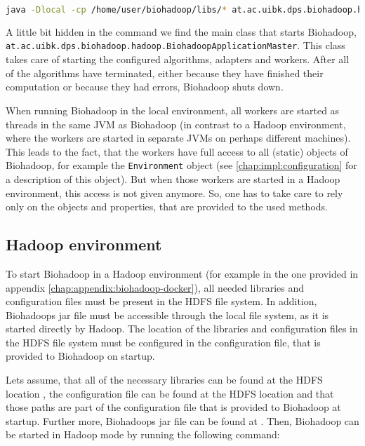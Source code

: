   \begin{lstlisting}[language=bash]
java -Dlocal -cp /home/user/biohadoop/libs/* at.ac.uibk.dps.biohadoop.hadoop.BiohadoopApplicationMaster /home/user/biohadoop/configs/simple-config-json
  \end{lstlisting}

  A little bit hidden in the command we find the main class that starts Biohadoop, \texttt{at.ac.uibk.dps.biohadoop.hadoop.BiohadoopApplicationMaster}. This class takes care of starting the configured algorithms, adapters and workers. After all of the algorithms have terminated, either because they have finished their computation or because they had errors, Biohadoop shuts down.
  
  When running Biohadoop in the local environment, all workers are started as threads in the same JVM as Biohadoop (in contrast to a Hadoop environment, where the workers are started in separate JVMs on perhaps different machines). This leads to the fact, that the workers have full access to all (static) objects of Biohadoop, for example the \texttt{Environment} object (see \ref{chap:impl:configuration} for a description of this object). But when those workers are started in a Hadoop environment, this access is not given anymore. So, one has to take care to rely only on the objects and properties, that are provided to the used methods.

  \subsection{Hadoop environment}
  \label{chap:usage:hadoop}
  To start Biohadoop in a Hadoop environment (for example in the one provided in appendix \ref{chap:appendix:biohadoop-docker}), all needed libraries and configuration files must be present in the HDFS file system. In addition, Biohadoops jar file must be accessible through the local file system, as it is started directly by Hadoop. The location of the libraries and configuration files in the HDFS file system must be configured in the configuration file, that is provided to Biohadoop on startup.
  
  Lets assume, that all of the necessary libraries can be found at the HDFS location , the configuration file can be found at the HDFS location  and that those paths are part of the configuration file that is provided to Biohadoop at startup. Further more, Biohadoops jar file can be found at . Then, Biohadoop can be started in Hadoop mode by running the following command:
  
